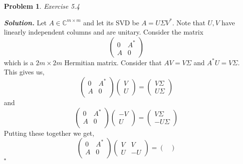 \documentclass[12pt]{report}
\newtheorem{problem}{Problem}
\newenvironment{solution}[1][\it{Solution}]{\textbf{#1. } }{$\square$}
\def\C{{\mathbb C}}
\begin{document}




\begin{problem}
    Exercise 5.4
\end{problem}

\begin{solution}
    \noindent
    Let $A \in \C^{m \times m}$ and let its SVD be $A = U \Sigma V^*$. Note that $U,V$ have linearly independent columns and are unitary. Consider the matrix $$\begin{pmatrix} 0 & A^* \\ A & 0 \end{pmatrix}$$
    which is a $2m \times 2m$ Hermitian matrix. Consider that $AV = V\Sigma$ and $A^*U=V\Sigma$. This gives us,
    $$\begin{pmatrix}
        0&A^*\\A&0\\
    \end{pmatrix}\begin{pmatrix}
        V\\U
    \end{pmatrix}=\begin{pmatrix}
        V\Sigma\\U\Sigma
    \end{pmatrix}$$
    and 
    $$\begin{pmatrix}
        0&A^*\\A&0\\
    \end{pmatrix}\begin{pmatrix}
        -V\\U
    \end{pmatrix}=\begin{pmatrix}
        V\Sigma\\-U\Sigma
    \end{pmatrix}$$
    Putting these together we get,
    $$\begin{pmatrix}
        0&A^*\\A&0\\
    \end{pmatrix}\begin{pmatrix}
        V&V\\U&-U
    \end{pmatrix}=\begin{pmatrix}

\end{pmatrix}$$
\end{solution}
\end{document}
